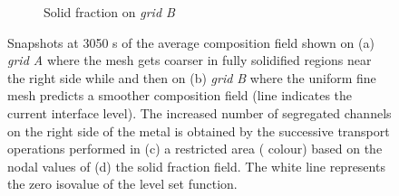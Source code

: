 \begin{figure}[htbp]
\begin{subfigure}[t]{0.4\textwidth}
  \caption{Solid fraction on \emph{grid B}}
    \label{fig:1200s_gs}
  \end{subfigure}
\caption{Snapshots at 3050 s of the average composition field shown on 
(a) \emph{grid A} where the mesh gets coarser in fully solidified regions near the right side while
and then on 
(b) \emph{grid B} where the uniform fine mesh predicts a smoother composition field (line indicates the current interface level). 
The increased number of segregated channels on the right side of the
metal is obtained by the successive transport operations performed in 
(c) a restricted area ( colour) based on the nodal values of (d) the solid fraction field.
The white line represents the zero isovalue of the level set function.}
\label{fig:W_mask_1200s}
\end{figure}

